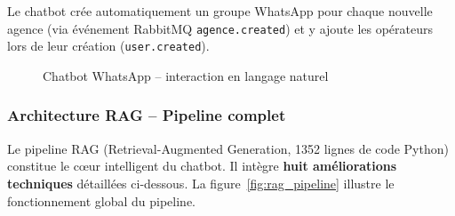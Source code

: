 Le chatbot cr\'{e}e automatiquement un groupe WhatsApp pour chaque nouvelle agence (via \'{e}v\'{e}nement RabbitMQ \texttt{agence.created}) et y ajoute les op\'{e}rateurs lors de leur cr\'{e}ation (\texttt{user.created}).

\begin{figure}[H]
    \centering
    \caption{Chatbot WhatsApp -- interaction en langage naturel}
    \label{fig:whatsapp}
\end{figure}

\subsubsection{Architecture RAG -- Pipeline complet}

Le pipeline RAG (Retrieval-Augmented Generation, 1352 lignes de code Python) constitue le c\oe ur intelligent du chatbot. Il int\`{e}gre \textbf{huit am\'{e}liorations techniques} d\'{e}taill\'{e}es ci-dessous. La figure~\ref{fig:rag_pipeline} illustre le fonctionnement global du pipeline.

